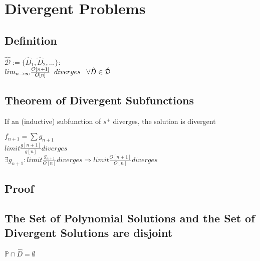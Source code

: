 \documentclass[11pt]{article}
\begin{document}
\newpage
\section{Divergent Problems}
\subsection{Definition}
\begin{center}
$
\mathcal{\hat{D}} := \{ \hat{D}_1,\hat{D}_2,...\} :
$
\\ \vspace{2mm}
$
lim_{n \rightarrow \infty} \frac{O[n+1]}{O[n]} \hspace{2mm} diverges \hspace{3mm} \forall \hat{D} \in \mathcal{\hat{D}}
$
\end{center}



\subsection{Theorem of Divergent Subfunctions}
If an (inductive) subfunction of $s^+$ diverges, the solution is divergent
\begin{center}
$
f_{n+1} = \sum g_{n+1}
$
\\ \vspace{2mm}
$
limit \frac{g[n+1]}{g[n]} diverges
$
\\ \vspace{3mm}
$
\exists g_{n+1} : limit \frac{g_{n+1}}{O[n]} diverges \Longrightarrow limit \frac{O[n+1]}{O[n]} diverges
$
\end{center}

\subsection{Proof}



\subsection{The Set of Polynomial Solutions and the Set of Divergent Solutions are disjoint}
\begin{center}
\vspace{2mm}
$
\mathbb{P} \cap \hat{D} = \emptyset
$
\end{center}
\end{document}
